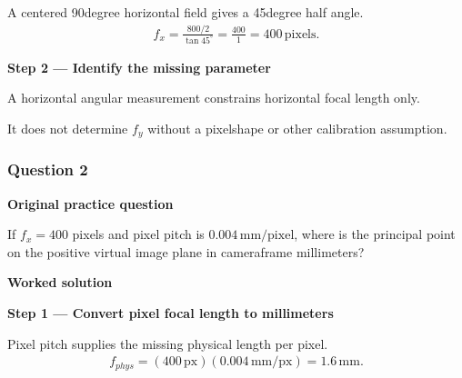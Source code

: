 \documentclass[letterpaper,11pt,english,openany,oneside]{jupyterBook}
\begin{document}
\sphinxAtStartPar
{} A centered 90\sphinxhyphen{}degree horizontal field gives a 45\sphinxhyphen{}degree half angle.
{\color{QuizMathBlue} \begin{equation*}
\begin{split}
f_x=\frac{800/2}{\tan45^\circ}=\frac{400}{1}=400\,\mathrm{pixels}.
\end{split}
\end{equation*}}
\par

\par\medskip{}
{\color{QuizStepRed}\bfseries Step 2 — Identify the missing parameter}\par\smallskip

\sphinxAtStartPar
{} A horizontal angular measurement constrains horizontal focal length only.

\sphinxAtStartPar
It does not determine {\color{QuizMathBlue} \(f_y\)} without a pixel\sphinxhyphen{}shape or other calibration assumption.

\par

\par\medskip


\subsubsection{Question 2}
\label{\detokenize{lectures/lecture03/tldr:question-2}}\label{\detokenize{lectures/lecture03/tldr:lec03-tldr-q2}}
\par\medskip\textbf{Original practice question}\par\smallskip

\sphinxAtStartPar
If \(f_x=400\) pixels and pixel pitch is \(0.004\,\mathrm{mm/pixel}\), where is the principal point on the positive virtual image plane in camera\sphinxhyphen{}frame millimeters?

\par\medskip

\par\medskip
\textbf{Worked solution}\par\smallskip

\par\medskip{}
{\color{QuizStepRed}\bfseries Step 1 — Convert pixel focal length to millimeters}\par\smallskip

\sphinxAtStartPar
{} Pixel pitch supplies the missing physical length per pixel.
{\color{QuizMathBlue} \begin{equation*}
\begin{split}
f_{phys}=(400\,\mathrm{px})(0.004\,\mathrm{mm/px})=1.6\,\mathrm{mm}.
\end{split}
\end{equation*}}
\par
\end{document}
